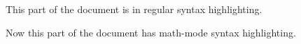 \documentclass{article}
\begin{document}
This part of the document is in regular syntax highlighting.


Now this part of the document has math-mode syntax highlighting.
\end{document}
